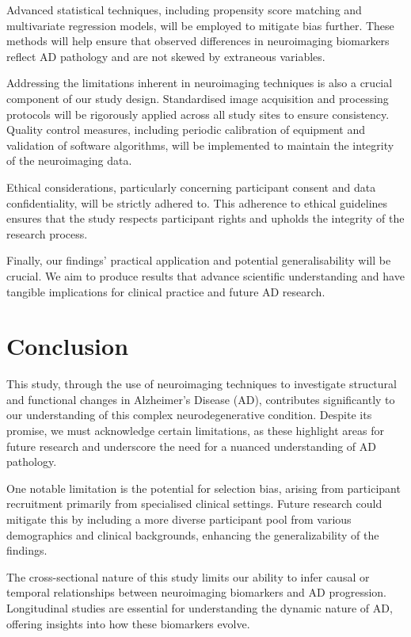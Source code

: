 \documentclass[10pt]{article}
\begin{document}
\begin{sloppypar}
  Advanced statistical techniques, including propensity score matching and multivariate regression models, will be employed to mitigate bias further. These methods will help ensure that observed differences in neuroimaging biomarkers reflect AD pathology and are not skewed by extraneous variables.

  Addressing the limitations inherent in neuroimaging techniques is also a crucial component of our study design. Standardised image acquisition and processing protocols will be rigorously applied across all study sites to ensure consistency. Quality control measures, including periodic calibration of equipment and validation of software algorithms, will be implemented to maintain the integrity of the neuroimaging data.

  Ethical considerations, particularly concerning participant consent and data confidentiality, will be strictly adhered to. This adherence to ethical guidelines ensures that the study respects participant rights and upholds the integrity of the research process.

  Finally, our findings’ practical application and potential generalisability will be crucial. We aim to produce results that advance scientific understanding and have tangible implications for clinical practice and future AD research.

  \section{Conclusion}
  \label{sec:conclusion}

  This study, through the use of neuroimaging techniques to investigate structural and functional changes in Alzheimer’s Disease (AD), contributes significantly to our understanding of this complex neurodegenerative condition. Despite its promise, we must acknowledge certain limitations, as these highlight areas for future research and underscore the need for a nuanced understanding of AD pathology.

  One notable limitation is the potential for selection bias, arising from participant recruitment primarily from specialised clinical settings. Future research could mitigate this by including a more diverse participant pool from various demographics and clinical backgrounds, enhancing the generalizability of the findings.

  The cross-sectional nature of this study limits our ability to infer causal or temporal relationships between neuroimaging biomarkers and AD progression. Longitudinal studies are essential for understanding the dynamic nature of AD, offering insights into how these biomarkers evolve.


\end{sloppypar}
\end{document}
